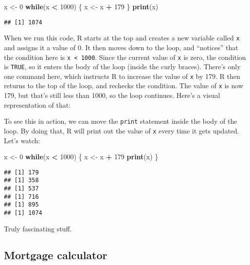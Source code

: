 \documentclass[]{book}
\newenvironment{Shaded}{\begin{snugshade}}{\end{snugshade}}
\newcommand{\ControlFlowTok}[1]{\textcolor[rgb]{0.13,0.29,0.53}{\textbf{#1}}}
\newcommand{\DecValTok}[1]{\textcolor[rgb]{0.00,0.00,0.81}{#1}}
\newcommand{\KeywordTok}[1]{\textcolor[rgb]{0.13,0.29,0.53}{\textbf{#1}}}
\newcommand{\NormalTok}[1]{#1}
\newcommand{\OperatorTok}[1]{\textcolor[rgb]{0.81,0.36,0.00}{\textbf{#1}}}
\newcommand{\StringTok}[1]{\textcolor[rgb]{0.31,0.60,0.02}{#1}}
\begin{document}
\begin{Shaded}
\begin{Highlighting}[]
\NormalTok{x <-}\StringTok{ }\DecValTok{0}
\ControlFlowTok{while}\NormalTok{(x }\OperatorTok{<}\StringTok{ }\DecValTok{1000}\NormalTok{) \{}
\NormalTok{  x <-}\StringTok{ }\NormalTok{x }\OperatorTok{+}\StringTok{ }\DecValTok{179}
\NormalTok{\}}
\KeywordTok{print}\NormalTok{(x)}
\end{Highlighting}
\end{Shaded}

\begin{verbatim}
## [1] 1074
\end{verbatim}

When we run this code, R starts at the top and creates a new variable called \texttt{x} and assigns it a value of 0. It then moves down to the loop, and ``notices'' that the condition here is \texttt{x\ \textless{}\ 1000}. Since the current value of \texttt{x} is zero, the condition is \texttt{TRUE}, so it enters the body of the loop (inside the curly braces). There's only one command here, which instructs R to increase the value of \texttt{x} by 179. R then returns to the top of the loop, and rechecks the condition. The value of \texttt{x} is now 179, but that's still less than 1000, so the loop continues. Here's a visual representation of that:

To see this in action, we can move the \texttt{print} statement inside the body of the loop. By doing that, R will print out the value of \texttt{x} every time it gets updated. Let's watch:

\begin{Shaded}
\begin{Highlighting}[]
\NormalTok{x <-}\StringTok{ }\DecValTok{0}
\ControlFlowTok{while}\NormalTok{(x }\OperatorTok{<}\StringTok{ }\DecValTok{1000}\NormalTok{) \{}
\NormalTok{  x <-}\StringTok{ }\NormalTok{x }\OperatorTok{+}\StringTok{ }\DecValTok{179}
  \KeywordTok{print}\NormalTok{(x)}
\NormalTok{\}}
\end{Highlighting}
\end{Shaded}

\begin{verbatim}
## [1] 179
## [1] 358
## [1] 537
## [1] 716
## [1] 895
## [1] 1074
\end{verbatim}

Truly fascinating stuff. 🤔

\hypertarget{mortgage-calculator}{%
\subsection{Mortgage calculator}\label{mortgage-calculator}}
\end{document}
